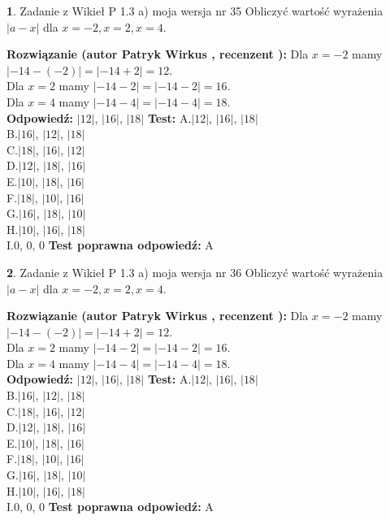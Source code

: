 \documentclass[12pt, a4paper]{article}
\theoremstyle{definition} %
\newtheorem{zad}{}
\newcommand{\zadStart}[1]{\begin{zad}#1\newline}
\newcommand{\zadStop}{\end{zad}}
\newcommand{\rozwStart}[2]{\noindent \textbf{Rozwiązanie (autor #1 , recenzent #2): }\newline}
\newcommand{\rozwStop}{\newline}
\newcommand{\odpStart}{\noindent \textbf{Odpowiedź:}\newline}
\newcommand{\odpStop}{\newline}
\newcommand{\testStart}{\noindent \textbf{Test:}\newline}
\newcommand{\testStop}{\newline}
\newcommand{\kluczStart}{\noindent \textbf{Test poprawna odpowiedź:}\newline}
\newcommand{\kluczStop}{\newline}
\begin{document}
\zadStart{Zadanie z Wikieł P 1.3 a) moja wersja nr 35}
Obliczyć wartość wyrażenia $|a - x|$ dla $x=-2,x=2,x=4$.
\zadStop
\rozwStart{Patryk Wirkus}{}
Dla $x = -2$ mamy $|-14 - (-2)| = |-14 + 2| = 12$.\\
Dla $x = 2$ mamy $|-14 - 2| = |-14 - 2| = 16$.\\
Dla $x = 4$ mamy $|-14 - 4| = |-14 - 4| = 18$.\\
\rozwStop
\odpStart
$|12|$, $|16|$, $|18|$
\odpStop
\testStart
A.$|12|$, $|16|$, $|18|$\\
B.$|16|$, $|12|$, $|18|$\\
C.$|18|$, $|16|$, $|12|$\\
D.$|12|$, $|18|$, $|16|$\\
E.$|10|$, $|18|$, $|16|$\\
F.$|18|$, $|10|$, $|16|$\\
G.$|16|$, $|18|$, $|10|$\\
H.$|10|$, $|16|$, $|18|$\\
I.$0$, $0$, $0$
\testStop
\kluczStart
A
\kluczStop



\zadStart{Zadanie z Wikieł P 1.3 a) moja wersja nr 36}
Obliczyć wartość wyrażenia $|a - x|$ dla $x=-2,x=2,x=4$.
\zadStop
\rozwStart{Patryk Wirkus}{}
Dla $x = -2$ mamy $|-14 - (-2)| = |-14 + 2| = 12$.\\
Dla $x = 2$ mamy $|-14 - 2| = |-14 - 2| = 16$.\\
Dla $x = 4$ mamy $|-14 - 4| = |-14 - 4| = 18$.\\
\rozwStop
\odpStart
$|12|$, $|16|$, $|18|$
\odpStop
\testStart
A.$|12|$, $|16|$, $|18|$\\
B.$|16|$, $|12|$, $|18|$\\
C.$|18|$, $|16|$, $|12|$\\
D.$|12|$, $|18|$, $|16|$\\
E.$|10|$, $|18|$, $|16|$\\
F.$|18|$, $|10|$, $|16|$\\
G.$|16|$, $|18|$, $|10|$\\
H.$|10|$, $|16|$, $|18|$\\
I.$0$, $0$, $0$
\testStop
\kluczStart
A
\kluczStop
\end{document}
